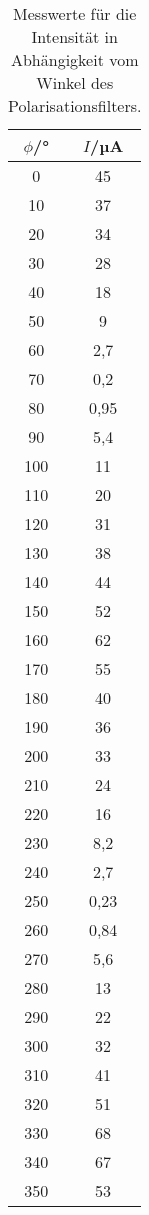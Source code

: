 \begin{table}[htp]
	\begin{center}
    \caption{Messwerte für die Intensität in Abhängigkeit vom Winkel des Polarisationsfilters.}
    \label{tab:polarisation}
		\begin{tabular}{cc}
		\toprule
			{$\phi$/°} & {$I$/µA}\\
			\midrule
			0 & 45\\
			10 & 37\\
			20 & 34\\
			30 & 28\\
			40 & 18\\
			50 & 9\\
			60 & 2,7\\
			70 & 0,2\\
			80 & 0,95\\
			90 & 5,4\\
			100 & 11\\
			110 & 20\\
			120 & 31\\
			130 & 38\\
			140 & 44\\
			150 & 52\\
			160 & 62\\
			170 & 55\\
			180 & 40\\
			190 & 36\\
			200 & 33\\
			210 & 24\\
			220 & 16\\
			230 & 8,2\\
			240 & 2,7\\
			250 & 0,23\\
			260 & 0,84\\
			270 & 5,6\\
			280 & 13\\
			290 & 22\\
			300 & 32\\
			310 & 41\\
			320 & 51\\
			330 & 68\\
			340 & 67\\
			350 & 53\\
		\bottomrule
		\end{tabular}
	\end{center}
\end{table}
